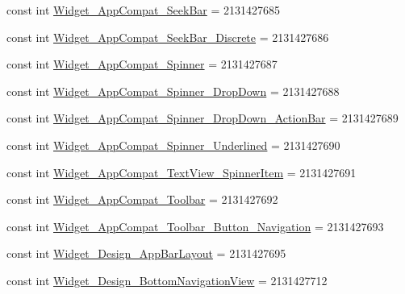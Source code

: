 \begin{DoxyCompactItemize}
\item 
const int \mbox{\hyperlink{class_f_w_p_s___app_1_1_droid_1_1_resource_1_1_style_a37dcc82999e40153a010ce7c9c22f481}{Widget\+\_\+\+App\+Compat\+\_\+\+Seek\+Bar}} = 2131427685
\item 
const int \mbox{\hyperlink{class_f_w_p_s___app_1_1_droid_1_1_resource_1_1_style_a5559434840c8f5a3a3c86148fd1a0b56}{Widget\+\_\+\+App\+Compat\+\_\+\+Seek\+Bar\+\_\+\+Discrete}} = 2131427686
\item 
const int \mbox{\hyperlink{class_f_w_p_s___app_1_1_droid_1_1_resource_1_1_style_a09ccb5387600c5d4ffb4a69e42a7a15f}{Widget\+\_\+\+App\+Compat\+\_\+\+Spinner}} = 2131427687
\item 
const int \mbox{\hyperlink{class_f_w_p_s___app_1_1_droid_1_1_resource_1_1_style_ac0febfac0e1d6967724e3fd9532b11be}{Widget\+\_\+\+App\+Compat\+\_\+\+Spinner\+\_\+\+Drop\+Down}} = 2131427688
\item 
const int \mbox{\hyperlink{class_f_w_p_s___app_1_1_droid_1_1_resource_1_1_style_a208508e814b9dedd49cd8c96970ea3ac}{Widget\+\_\+\+App\+Compat\+\_\+\+Spinner\+\_\+\+Drop\+Down\+\_\+\+Action\+Bar}} = 2131427689
\item 
const int \mbox{\hyperlink{class_f_w_p_s___app_1_1_droid_1_1_resource_1_1_style_aa775f744043ea13613f039c1b54c970a}{Widget\+\_\+\+App\+Compat\+\_\+\+Spinner\+\_\+\+Underlined}} = 2131427690
\item 
const int \mbox{\hyperlink{class_f_w_p_s___app_1_1_droid_1_1_resource_1_1_style_a4d585da6d3f957f639f0004b2170443d}{Widget\+\_\+\+App\+Compat\+\_\+\+Text\+View\+\_\+\+Spinner\+Item}} = 2131427691
\item 
const int \mbox{\hyperlink{class_f_w_p_s___app_1_1_droid_1_1_resource_1_1_style_a1e2ba7ab6ae25db329d9bd549d0cafe4}{Widget\+\_\+\+App\+Compat\+\_\+\+Toolbar}} = 2131427692
\item 
const int \mbox{\hyperlink{class_f_w_p_s___app_1_1_droid_1_1_resource_1_1_style_ae9f14c458b1f3c4a395a054f80150cfa}{Widget\+\_\+\+App\+Compat\+\_\+\+Toolbar\+\_\+\+Button\+\_\+\+Navigation}} = 2131427693
\item 
const int \mbox{\hyperlink{class_f_w_p_s___app_1_1_droid_1_1_resource_1_1_style_af2050172956a79ddde22415c26b2df31}{Widget\+\_\+\+Design\+\_\+\+App\+Bar\+Layout}} = 2131427695
\item 
const int \mbox{\hyperlink{class_f_w_p_s___app_1_1_droid_1_1_resource_1_1_style_a6ee5dbde62e310380b9d34b8f72a81bf}{Widget\+\_\+\+Design\+\_\+\+Bottom\+Navigation\+View}} = 2131427712
\item 

\end{DoxyCompactItemize}

